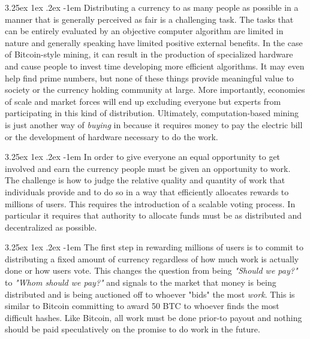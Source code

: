 \documentclass{article}
\makeatletter
\renewcommand\paragraph{\@startsection{paragraph}{5}{\z@}%
  {3.25ex \@plus1ex \@minus.2ex}%
  {-1em}%
  {\normalfont\normalsize\bfseries}}
\makeatother
\begin{document}
                \paragraph{}
                    Distributing a currency to as many people as possible in a manner that is generally perceived as fair is a challenging task. The tasks that can be entirely evaluated by an objective computer algorithm are limited in nature and generally speaking have limited positive external benefits. In the case of Bitcoin-style mining, it can result in the production of specialized hardware and cause people to invest time developing more efficient algorithms. It may even help find prime numbers, but none of these things provide meaningful value to society or the currency holding community at large. More importantly, economies of scale and market forces will end up excluding everyone but experts from participating in this kind of distribution. Ultimately, computation-based mining is just another way of \textit{buying} in because it requires money to pay the electric bill or the development of hardware necessary to do the work.

                \paragraph{}
                    In order to give everyone an equal opportunity to get involved and earn the currency people must be given an opportunity to work. The challenge is how to judge the relative quality and quantity of work that individuals provide and to do so in a way that efficiently allocates rewards to millions of users. This requires the introduction of a scalable voting process. In particular it requires that authority to allocate funds must be as distributed and decentralized as possible.

                \paragraph{}
                    The first step in rewarding millions of users is to commit to distributing a fixed amount of currency regardless of how much work is actually done or how users vote. This changes the question from being \textit{"Should we pay?"} to \textit{"Whom should we pay?"} and signals to the market that money is being distributed and is being auctioned off to whoever "bids" the most \textit{work}. This is similar to Bitcoin committing to award 50 BTC to whoever finds the most difficult hashes. Like Bitcoin, all work must be done prior-to payout and nothing should be paid speculatively on the promise to do work in the future.
\end{document}
